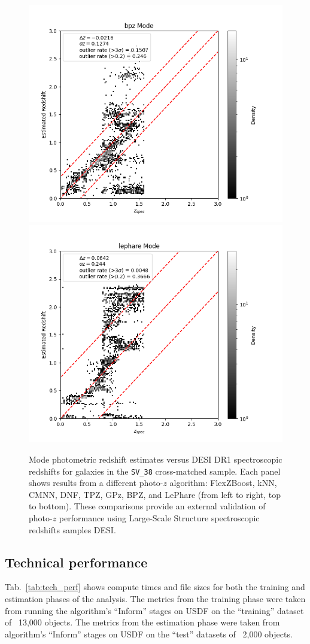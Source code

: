 \begin{figure}
\includegraphics[width=0.32\linewidth]{figures/bpz_mode_desi.png}
\includegraphics[width=0.32\linewidth]{figures/lephare_mode_desi.png}
\caption{Mode photometric redshift estimates versus DESI DR1 spectroscopic redshifts for galaxies in the \texttt{SV\_38} cross-matched sample. Each panel shows results from a different photo-$z$ algorithm: FlexZBoost, kNN, CMNN, DNF, TPZ, GPz, BPZ, and LePhare (from left to right, top to bottom). These comparisons provide an external validation of photo-$z$ performance using Large-Scale Structure spectroscopic redshifts samples DESI.}
\label{fig:sv_validation}
\end{figure}






\subsection{Technical performance}
\label{sec:performance:technical}

Tab.~\ref{tab:tech_perf} shows compute times and file sizes for both the training and estimation phases of the analysis.    The metrics from the training phase were taken from running the algorithm's ``Inform'' stages on USDF on the ``training'' dataset of ~13,000 objects.    The metrics from the estimation phase were taken from algorithm's ``Inform'' stages on USDF on the ``test'' datasets of ~2,000 objects.

